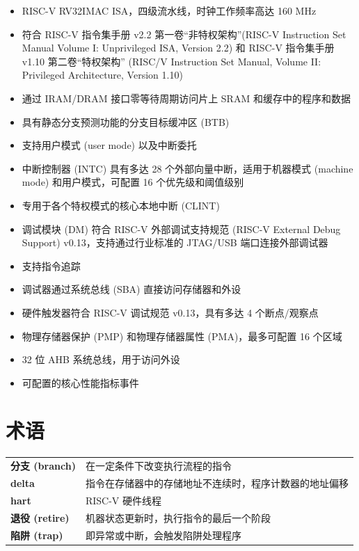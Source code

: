 \documentclass[main\_\_CN.tex]{subfiles}
\begin{document}
\begin{itemize}
    \item RISC-V RV32IMAC ISA，四级流水线，时钟工作频率高达 160 MHz
    \item 符合 RISC-V 指令集手册 v2.2 第一卷“非特权架构”(RISC-V Instruction Set Manual Volume I: Unprivileged ISA, Version 2.2) 和 RISC-V 指令集手册 v1.10 第二卷“特权架构” (RISC\-/V Instruction Set Manual, Volume II: Privileged Architecture, Version 1.10)
    \item 通过 IRAM/DRAM 接口零等待周期访问片上 SRAM 和缓存中的程序和数据
    \item 具有静态分支预测功能的分支目标缓冲区 (BTB)
    \item 支持用户模式 (user mode) 以及中断委托
    \item 中断控制器 (INTC) 具有多达 28 个外部向量中断，适用于机器模式 (machine mode) 和用户模式，可配置 16 个优先级和阈值级别
    \item 专用于各个特权模式的核心本地中断 (CLINT)
    \item 调试模块 (DM) 符合 RISC-V 外部调试支持规范 (RISC-V External Debug Support) v0.13，支持通过行业标准的 JTAG/USB 端口连接外部调试器
    \item 支持指令追踪
    \item 调试器通过系统总线 (SBA) 直接访问存储器和外设
    \item 硬件触发器符合 RISC-V 调试规范 v0.13，具有多达 4 个断点/观察点
    \item 物理存储器保护 (PMP) 和物理存储器属性 (PMA)，最多可配置 16 个区域
    \item 32 位 AHB 系统总线，用于访问外设
    \item 可配置的核心性能指标事件
\end{itemize}

\section{术语}

\begin{longtable}[c]{ R{4cm} p{12cm} }
\textbf{分支 (branch)} & 在一定条件下改变执行流程的指令 \\
\textbf{delta} & 指令在存储器中的存储地址不连续时，程序计数器的地址偏移 \\
\textbf{hart} &  RISC-V 硬件线程 \\
\textbf{退役 (retire)} & 机器状态更新时，执行指令的最后一个阶段 \\
\textbf{陷阱 (trap)} & 即异常或中断，会触发陷阱处理程序 \\
\end{longtable}
\end{document}
